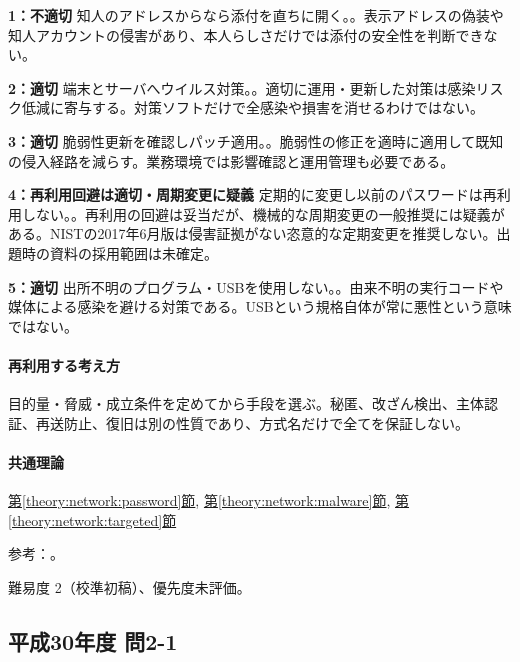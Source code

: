 \noindent\textbf{1：不適切} 知人のアドレスからなら添付を直ちに開く。。表示アドレスの偽装や知人アカウントの侵害があり、本人らしさだけでは添付の安全性を判断できない。\par

\noindent\textbf{2：適切} 端末とサーバへウイルス対策。。適切に運用・更新した対策は感染リスク低減に寄与する。対策ソフトだけで全感染や損害を消せるわけではない。\par

\noindent\textbf{3：適切} 脆弱性更新を確認しパッチ適用。。脆弱性の修正を適時に適用して既知の侵入経路を減らす。業務環境では影響確認と運用管理も必要である。\par

\noindent\textbf{4：再利用回避は適切・周期変更に疑義} 定期的に変更し以前のパスワードは再利用しない。。再利用の回避は妥当だが、機械的な周期変更の一般推奨には疑義がある。NISTの2017年6月版は侵害証拠がない恣意的な定期変更を推奨しない。出題時の資料の採用範囲は未確定。\par

\noindent\textbf{5：適切} 出所不明のプログラム・USBを使用しない。。由来不明の実行コードや媒体による感染を避ける対策である。USBという規格自体が常に悪性という意味ではない。\par

\paragraph{再利用する考え方} 目的量・脅威・成立条件を定めてから手段を選ぶ。秘匿、改ざん検出、主体認証、再送防止、復旧は別の性質であり、方式名だけで全てを保証しない。

\paragraph{共通理論} \hyperref[theory:network:password]{第\ref*{theory:network:password}節}, \hyperref[theory:network:malware]{第\ref*{theory:network:malware}節}, \hyperref[theory:network:targeted]{第\ref*{theory:network:targeted}節}

\par 参考：\cite{net_nist2017,net_target2020,net_ipa_account}。

\par 難易度 2（校準初稿）、優先度未評価。

\subsection{平成30年度 問2-1}
\label{q:h30-reg-basic-2-1}

